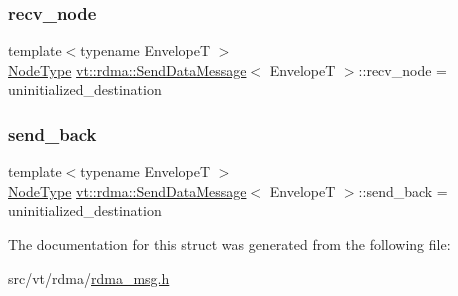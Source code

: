 \subsubsection{\texorpdfstring{recv\+\_\+node}{recv\_node}}
{\footnotesize\ttfamily template$<$typename EnvelopeT $>$ \\
\hyperlink{namespacevt_a866da9d0efc19c0a1ce79e9e492f47e2}{Node\+Type} \hyperlink{structvt_1_1rdma_1_1_send_data_message}{vt\+::rdma\+::\+Send\+Data\+Message}$<$ EnvelopeT $>$\+::recv\+\_\+node = uninitialized\+\_\+destination}

\mbox{\label{structvt_1_1rdma_1_1_send_data_message_a9dc041340e97f80049273da30b9214cb}} 
\subsubsection{\texorpdfstring{send\+\_\+back}{send\_back}}
{\footnotesize\ttfamily template$<$typename EnvelopeT $>$ \\
\hyperlink{namespacevt_a866da9d0efc19c0a1ce79e9e492f47e2}{Node\+Type} \hyperlink{structvt_1_1rdma_1_1_send_data_message}{vt\+::rdma\+::\+Send\+Data\+Message}$<$ EnvelopeT $>$\+::send\+\_\+back = uninitialized\+\_\+destination}



The documentation for this struct was generated from the following file\+:\begin{DoxyCompactItemize}
\item 
src/vt/rdma/\hyperlink{rdma__msg_8h}{rdma\+\_\+msg.\+h}\end{DoxyCompactItemize}
